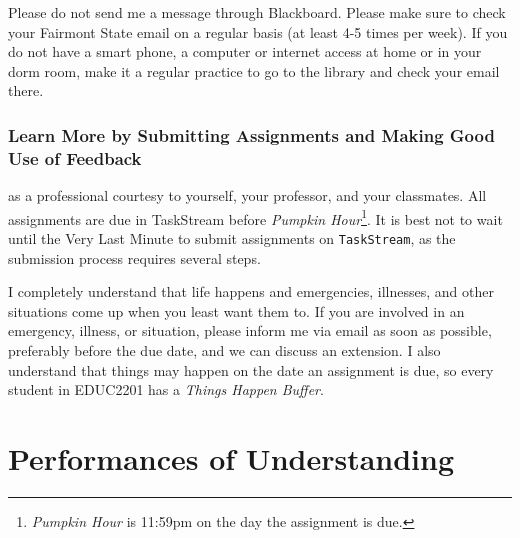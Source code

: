 \documentclass{tufte-handout}
\begin{document}
 Please do not send me a message through Blackboard. Please make sure to check your Fairmont State email on a regular basis (at least 4-5 times per week). If you do not have a smart phone, a computer or internet access at home or in your dorm room, make it a regular practice to go to the library and check your email there.

\section{Learn More by Submitting Assignments and Making Good Use of Feedback}
 as a professional courtesy to yourself, your professor, and your classmates. All assignments are due in TaskStream before \textit{Pumpkin Hour}\footnote{\textit{Pumpkin Hour} is 11:59pm on the day the assignment is due.}. It is best not to wait until the Very Last Minute to submit assignments on \texttt{TaskStream}, as the submission process requires several steps.

I completely understand that life happens and emergencies, illnesses, and other situations come up when you least want them to. If you are involved in an emergency, illness, or situation, please inform me via email as soon as possible, preferably before the due date, and we can discuss an extension. I also understand that things may happen on the date an assignment is due, so every student in EDUC2201 has a \textit{Things Happen Buffer}.

\newpage

\part{Performances of Understanding}
\end{document}
